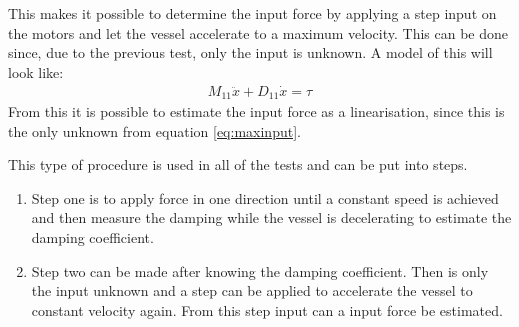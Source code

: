 This makes it possible to determine the input force by applying a step input on the motors and let the vessel accelerate to a maximum velocity. This can be done since, due to the previous test, only the input is unknown. A model of this will look like:
\begin{align} 
M_{11} \ddot x + D_{11} \dot x = \tau
\label{eq:maxinput}
\end{align}
From this it is possible to estimate the input force as a linearisation, since this is the only unknown from equation \ref{eq:maxinput}.

This type of procedure is used in all of the tests and can be put into steps.
\begin{enumerate}
	\item Step one is to apply force in one direction until a constant speed is achieved and then measure the damping while the vessel is decelerating to estimate the damping coefficient.
	\item Step two can be made after knowing the damping coefficient. Then is only the input unknown and a step can be applied to accelerate the vessel to constant velocity again. From this step input can a input force be estimated.
\end{enumerate}


